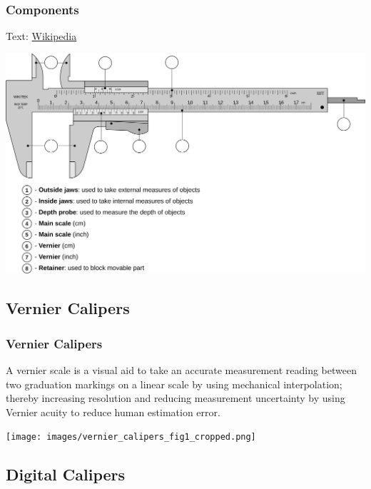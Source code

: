 \documentclass[fleqn]{beamer} %
\newcommand{\sectionIsubsectionIItitle}{Components}
\newcommand{\sectionIsubsectionIIItitle}{Vernier Calipers}
\newcommand{\sectionIsubsectionIVtitle}{Digital Calipers}
\begin{document}
			\begin{frame}
				\frametitle{\sectionIsubsectionIItitle}

				{\tiny Text: \href{https://en.wikipedia.org/wiki/Vernier_scale}{Wikipedia}}

				\includegraphics[scale=.08]{images/calipers_fig1.png}

			\end{frame}


		\subsection{\sectionIsubsectionIIItitle}\label{sectionIsubsectionIII}
			\begin{frame} 
				\frametitle{\sectionIsubsectionIIItitle}
					\scriptsize	

					A vernier scale is a visual aid to take an accurate measurement reading between two graduation markings on a linear scale by using mechanical interpolation; thereby increasing resolution and reducing measurement uncertainty by using Vernier acuity to reduce human estimation error. \vspc

					\texttt{[image: images/vernier\_calipers\_fig1\_cropped.png]}

			\end{frame}	

		\subsection{\sectionIsubsectionIVtitle}\label{sectionIsubsectionIV}	
\end{document}
